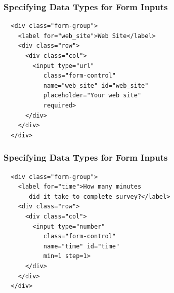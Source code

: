\documentclass[14pt,aspectratio=169]{beamer}
\begin{document}
%
\begin{frame}[fragile]
  \frametitle{Specifying Data Types for Form Inputs}
  \normalsize
  \begin{minipage}{6in}
    \vspace*{.1in}
    \begin{verbatim}
  <div class="form-group">
    <label for="web_site">Web Site</label>
    <div class="row">
      <div class="col">
        <input type="url"
           class="form-control"
           name="web_site" id="web_site"
           placeholder="Your web site"
           required>
      </div>
    </div>
  </div>
    \end{verbatim}
  \end{minipage}
\end{frame}

%
\begin{frame}[fragile]
  \frametitle{Specifying Data Types for Form Inputs}
  \normalsize
  \begin{minipage}{6in}
    \vspace*{.1in}
    \begin{verbatim}
  <div class="form-group">
    <label for="time">How many minutes
       did it take to complete survey?</label>
    <div class="row">
      <div class="col">
        <input type="number"
           class="form-control"
           name="time" id="time"
           min=1 step=1>
      </div>
    </div>
  </div>
    \end{verbatim}
  \end{minipage}
\end{frame}
\end{document}
